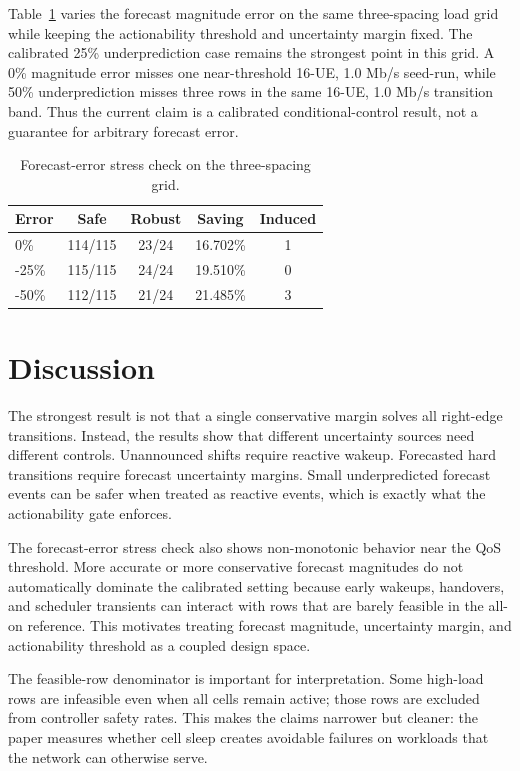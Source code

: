 \documentclass[10pt,twocolumn]{article}
\begin{document}
Table~\ref{tab:forecast-error} varies the forecast magnitude error on the same
three-spacing load grid while keeping the actionability threshold and
uncertainty margin fixed.  The calibrated 25\% underprediction case remains the
strongest point in this grid.  A 0\% magnitude error misses one near-threshold
16-UE, 1.0 Mb/s seed-run, while 50\% underprediction misses three rows in the
same 16-UE, 1.0 Mb/s transition band.  Thus the current claim is a calibrated
conditional-control result, not a guarantee for arbitrary forecast error.

\begin{table}[H]
\centering
\caption{Forecast-error stress check on the three-spacing grid.}
\label{tab:forecast-error}
\small
\begin{tabular}{lcccc}
\toprule
Error & Safe & Robust & Saving & Induced \\
\midrule
0\% & 114/115 & 23/24 & 16.702\% & 1 \\
-25\% & 115/115 & 24/24 & 19.510\% & 0 \\
-50\% & 112/115 & 21/24 & 21.485\% & 3 \\
\bottomrule
\end{tabular}
\end{table}

\section{Discussion}

The strongest result is not that a single conservative margin solves all
right-edge transitions.  Instead, the results show that different uncertainty
sources need different controls.  Unannounced shifts require reactive wakeup.
Forecasted hard transitions require forecast uncertainty margins.  Small
underpredicted forecast events can be safer when treated as reactive events,
which is exactly what the actionability gate enforces.

The forecast-error stress check also shows non-monotonic behavior near the QoS
threshold.  More accurate or more conservative forecast magnitudes do not
automatically dominate the calibrated setting because early wakeups, handovers,
and scheduler transients can interact with rows that are barely feasible in the
all-on reference.  This motivates treating forecast magnitude, uncertainty
margin, and actionability threshold as a coupled design space.

The feasible-row denominator is important for interpretation.  Some high-load
rows are infeasible even when all cells remain active; those rows are excluded
from controller safety rates.  This makes the claims narrower but cleaner: the
paper measures whether cell sleep creates avoidable failures on workloads that
the network can otherwise serve.
\end{document}
